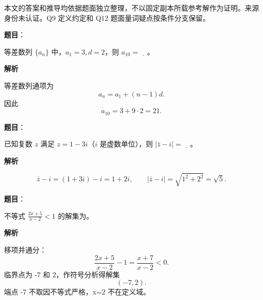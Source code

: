 

\begin{gktip}
本文的答案和推导均依据题面独立整理，不以固定副本所载参考解作为证明。来源身份未认证。Q9 定义约定和 Q12 题面量词疑点按条件分支保留。
\end{gktip}

\begin{answer}

\textbf{题目}：

等差数列 $\{a_n\}$ 中，$a_1=3,d=2$，则 $a_{10}=\underline{\quad}$。

\textbf{解析}

等差数列通项为
\nopagebreak[4]
\[
a_n=a_1+(n-1)d.
\]
因此
\nopagebreak[4]
\[
a_{10}=3+9\cdot2=21.
\]


\end{answer}
\begin{answer}

\textbf{题目}：

已知复数 $z$ 满足 $z=1-3i$（$i$ 是虚数单位），则 $|\bar z-i|=\underline{\quad}$。

\textbf{解析}

\nopagebreak[4]
\[
\bar z-i=(1+3i)-i=1+2i,
\qquad |\bar z-i|=\sqrt{1^2+2^2}=\sqrt5.
\]


\end{answer}
\begin{answer}

\textbf{题目}：

不等式 $\frac{2x+5}{x-2}<1$ 的解集为\gkblank{}。

\textbf{解析}

移项并通分：
\nopagebreak[4]
\[
\frac{2x+5}{x-2}-1=\frac{x+7}{x-2}<0.
\]
临界点为 -7 和 2，作符号分析得解集
\nopagebreak[4]
\[
(-7,2).
\]
端点 -7 不取因不等式严格，x=2 不在定义域。


\end{answer}
